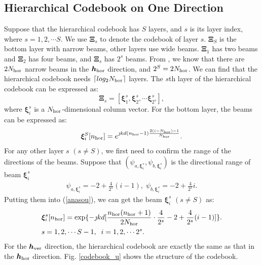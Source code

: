 \documentclass[12pt,draftclsnofoot,onecolumn]{IEEEtran}
\begin{document}
	\subsection{Hierarchical Codebook on One Direction}
	Suppose that the  hierarchical codebook has $S$  layers, and  $s$ is its layer index, where  $s=1,2,  \cdots  S$. We use ${\bm\Xi}_s$ to denote the codebook of layer $s$. ${\bm \Xi}_S$ is the bottom layer with narrow beams, other layers use wide beams. $\bm \Xi_1$ has two beams and ${\bm \Xi}_2$ has four beams, and ${\bm \Xi}_s$ has $2^s$ beams. From \cite{DBLP:journals/tvt/NingCCDF21}, we know that there are $2N_{\rm hor}$ narrow beams in the  ${\bm h}_{\rm hor}$ direction, and $2^S=2N_{\rm hor}$. We can find that the hierarchical codebook needs $\lceil log_2 N_{\rm hor}\rceil$ layers. The $s$th layer of the hierarchical codebook can be expressed as:
	\begin{equation}
		{\bm \Xi}_s=[{\bm\xi}_1^s,{\bm\xi}_2^s,\cdots {\bm \xi}_{2^s}^s],
	\end{equation}
	where  ${\bm \xi}_i^s$ is  a $N_{\rm hor}$-dimensional column vector.
	For the bottom layer,  the beams can be expressed as:
	\begin{equation}
		{\bm \xi}_i^S[n_{\rm hor}]= e^{{\jmath}kd(n_{\rm hor}-1)\frac{2(i-N_{\rm hor})-1}{N_{\rm hor}}}.
	\end{equation}
	For any other layer $s$ $(s \ne S)$, we first  need to confirm the range of the directions of the beams. Suppose that  $(\psi_{a,{\bm \xi}_i^s},\psi_{b,{\bm \xi}_i^s})$ is the directional range of beam ${\bm \xi}_i^s$
	\begin{equation}\label{xiab}
		\begin{split}
			\psi_{a,{\bm \xi}_i^s}=-2+\frac{4}{2^s}(i-1),\;
			\psi_{b,{\bm \xi}_i^s}=-2+\frac{4}{2^s}i.
		\end{split}
	\end{equation}
	Putting them into (\ref{anasou}), we can get the beam ${\bm \xi}_i^s$ $(s \ne S)$ as:
	\begin{equation}\label{xi}
		\begin{split}
			&{\bm \xi}_i^s[n_{\rm hor}]={\rm exp}\{-{\jmath}kd[\frac{n_{\rm hor}(n_{\rm hor}+1)}{2N_{\rm hor}} \cdot \frac{4}{2^s}-2+ \frac{4}{2^s}(i-1)]\}.\\
			&s=1,2, \cdots S-1,\;\;
			i=1,2, \cdots 2^s.
		\end{split}
	\end{equation}
	For the ${\bm h}_{\rm ver}$ direction, the hierarchical codebook are exactly the same as that in  the ${\bm h}_{\rm hor}$ direction. Fig. \ref{codebook_u} shows  the structure  of the codebook.
\end{document}
